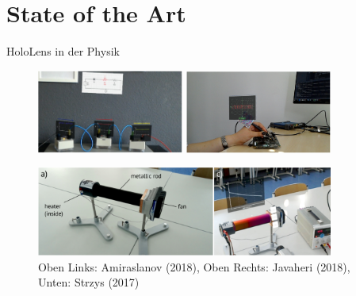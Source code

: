 \part{State of the Art}
\label{part:sota}
\begin{frame}[fragile]{HoloLens in der Physik}
\begin{figure}
	\includegraphics[width=0.43\textwidth]{images/papers/Amiraslanov18.png}
	\includegraphics[width=0.43\textwidth]{images/papers/Javaheri18.png}
	\begin{center}
	\vspace{0.05cm}
	\includegraphics[width=0.87\textwidth]{images/papers/Strzys18.png}	
	\end{center}
	\setlength{\abovecaptionskip}{7pt plus 5pt minus 2pt}
	\caption*{Oben Links: Amiraslanov (2018), Oben Rechts: Javaheri (2018), Unten: Strzys (2017)}
\end{figure}
\end{frame}

